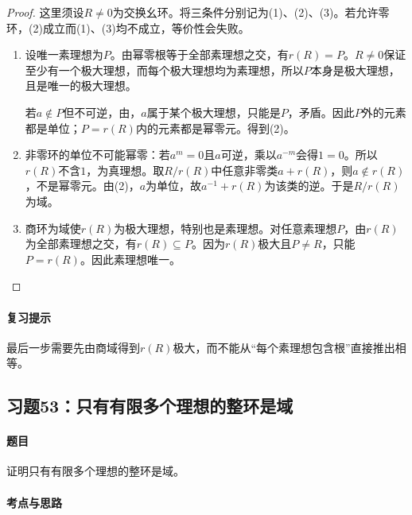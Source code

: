 \begin{proof}

这里须设$R\ne0$为交换幺环。将三条件分别记为(1)、(2)、(3)。若允许零环，(2)成立而(1)、(3)均不成立，等价性会失败。

\begin{enumerate}
\item[(1)$\Rightarrow$(2)] 设唯一素理想为$P$。由幂零根等于全部素理想之交，有$r(R)=P$。$R\ne0$保证至少有一个极大理想，而每个极大理想均为素理想，所以$P$本身是极大理想，且是唯一的极大理想。

若$a\notin P$但不可逆，由，$a$属于某个极大理想，只能是$P$，矛盾。因此$P$外的元素都是单位；$P=r(R)$内的元素都是幂零元。得到(2)。
\item[(2)$\Rightarrow$(3)] 非零环的单位不可能幂零：若$a^m=0$且$a$可逆，乘以$a^{-m}$会得$1=0$。所以$r(R)$不含$1$，为真理想。取$R/r(R)$中任意非零类$a+r(R)$，则$a\notin r(R)$，不是幂零元。由(2)，$a$为单位，故$a^{-1}+r(R)$为该类的逆。于是$R/r(R)$为域。
\item[(3)$\Rightarrow$(1)] 商环为域使$r(R)$为极大理想，特别也是素理想。对任意素理想$P$，由$r(R)$为全部素理想之交，有$r(R)\subseteq P$。因为$r(R)$极大且$P\ne R$，只能$P=r(R)$。因此素理想唯一。
\end{enumerate}

\end{proof}

\paragraph{复习提示}

最后一步需要先由商域得到$r(R)$极大，而不能从“每个素理想包含根”直接推出相等。



\subsection{习题53：只有有限多个理想的整环是域}

\label{ex:3:53}

\paragraph{题目}

证明只有有限多个理想的整环是域。

\paragraph{考点与思路}

